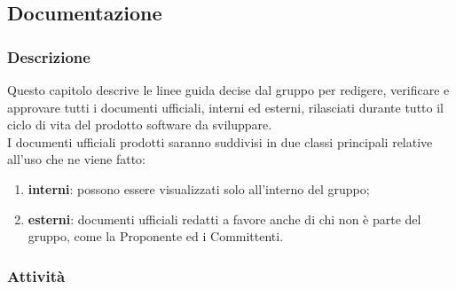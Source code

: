 \subsection{Documentazione}

	\subsubsection{Descrizione}
	Questo capitolo descrive le linee guida decise dal gruppo per redigere, verificare e approvare tutti i documenti ufficiali, interni ed esterni, rilasciati durante tutto il ciclo di vita del prodotto software da sviluppare.\\
	I documenti ufficiali prodotti saranno suddivisi in due classi principali relative all'uso che ne viene fatto:
	\begin{enumerate}
		\item \textbf{interni}: possono essere visualizzati solo all'interno del gruppo;
		\item \textbf{esterni}: documenti ufficiali redatti a favore anche di chi non è parte del gruppo, come la Proponente ed i Committenti.
	\end{enumerate}

	\subsubsection{Attività}
